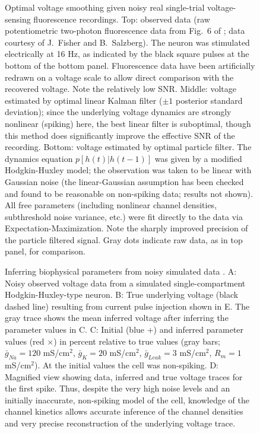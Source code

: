 \documentclass[12pt]{article}
\begin{document}
\begin{figure}[p]
\begin{center}
\epsfxsize=6in
\caption{\small Optimal voltage smoothing given noisy real
single-trial voltage-sensing fluorescence recordings.  Top: observed
data (raw potentiometric two-photon fluorescence data from Fig.\ 6 of
\cite{Fisher08}; data courtesy of J.\ Fisher and B.\ Salzberg).  The
neuron was stimulated electrically at 16 Hz, as indicated by the black
square pulses at the bottom of the bottom panel.  Fluorescence data
have been artificially redrawn on a voltage scale to allow direct
comparison with the recovered voltage.  Note the relatively low SNR.
Middle: voltage estimated by optimal linear Kalman filter ($\pm 1$
posterior standard deviation); since the underlying voltage dynamics
are strongly nonlinear (spiking) here, the best linear filter is
suboptimal, though this method does significantly improve the
effective SNR of the recording.  Bottom: voltage estimated by optimal
particle filter.  The dynamics equation $p[h(t)|h(t-1)]$ was given by
a modified Hodgkin-Huxley model; the observation was taken to be
linear with Gaussian noise (the linear-Gaussian assumption has been
checked and found to be reasonable on non-spiking data; results not
shown).  All free parameters (including nonlinear channel densities,
subthreshold noise variance, etc.) were fit directly to the data via
Expectation-Maximization.  Note the sharply improved precision of the
particle filtered signal.  Gray dots indicate raw data, as in top
panel, for comparison.}
\label{fig:fisher}
\end{center}
\end{figure}


\begin{figure}[t!]
\begin{center}
\epsfxsize=6in
\caption{\small Inferring biophysical parameters from noisy simulated
  data \cite{HP06}.  A: Noisy observed voltage data from a simulated
  single-compartment Hodgkin-Huxley-type neuron.  B: True underlying
  voltage (black dashed line) resulting from current pulse injection
  shown in E. The gray trace shows the mean inferred voltage after
  inferring the parameter values in C. C: Initial (blue +) and
  inferred parameter values (red $\times$) in percent relative to true
  values (gray bars; $\bar g_{Na} = 120$ mS/cm$^2$, $\bar g_{K} = 20$
  mS/cm$^2$, $\bar g_{Leak} = 3$ mS/cm$^2$, $R_m = 1$ mS/cm$^2$).  At
  the initial values the cell was non-spiking. D: Magnified view
  showing data, inferred and true voltage traces for the first
  spike. Thus, despite the very high noise levels and an initially
  inaccurate, non-spiking model of the cell, knowledge of the channel
  kinetics allows accurate inference of the channel densities and very
  precise reconstruction of the underlying voltage trace.}
\label{fig:hh-em}
\end{center}
\end{figure}
\end{document}
